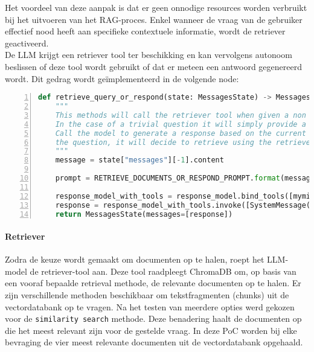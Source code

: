 Het voordeel van deze aanpak is dat er geen onnodige resources worden verbruikt bij het uitvoeren van het RAG-proces. Enkel wanneer de vraag van de gebruiker effectief nood heeft aan specifieke contextuele informatie, wordt de retriever geactiveerd.
\\[1em]
De LLM krijgt een retriever tool ter beschikking en kan vervolgens autonoom beslissen of deze tool wordt gebruikt of dat er meteen een antwoord gegenereerd wordt. Dit gedrag wordt geïmplementeerd in de volgende node:

\begin{lstlisting}[basicstyle=\small, frame=single, breaklines=true, postbreak=\mbox{\textcolor{red}{$\hookrightarrow$}\space}, escapeinside ={\%,}, escapechar={!}, numbers=left, language=Python, caption=Node die keuze maakt tussen om al dan niet te retrieven]
def retrieve_query_or_respond(state: MessagesState) -> MessagesState:
    """
    This methods will call the retriever tool when given a non trivial question is asked.
    In the case of a trivial question it will simply provide a response
    Call the model to generate a response based on the current state. Given
    the question, it will decide to retrieve using the retriever tool, or simply respond to the user.
    """
    message = state["messages"][-1].content
    
    prompt = RETRIEVE_DOCUMENTS_OR_RESPOND_PROMPT.format(message=message)
    
    response_model_with_tools = response_model.bind_tools([myminfin_retriever_tool])
    response = response_model_with_tools.invoke([SystemMessage(content=prompt), HumanMessage(content=message)])
    return MessagesState(messages=[response])
\end{lstlisting}

\paragraph{Retriever}

Zodra de keuze wordt gemaakt om documenten op te halen, roept het LLM-model de retriever-tool aan. Deze tool raadpleegt ChromaDB om, op basis van een vooraf bepaalde retrieval methode, de relevante documenten op te halen. Er zijn verschillende methoden beschikbaar om tekstfragmenten (chunks) uit de vectordatabank op te vragen. Na het testen van meerdere opties werd gekozen voor de \verb|similarity search| methode. Deze benadering haalt de documenten op die het meest relevant zijn voor de gestelde vraag. In deze PoC worden bij elke bevraging de vier meest relevante documenten uit de vectordatabank opgehaald.


